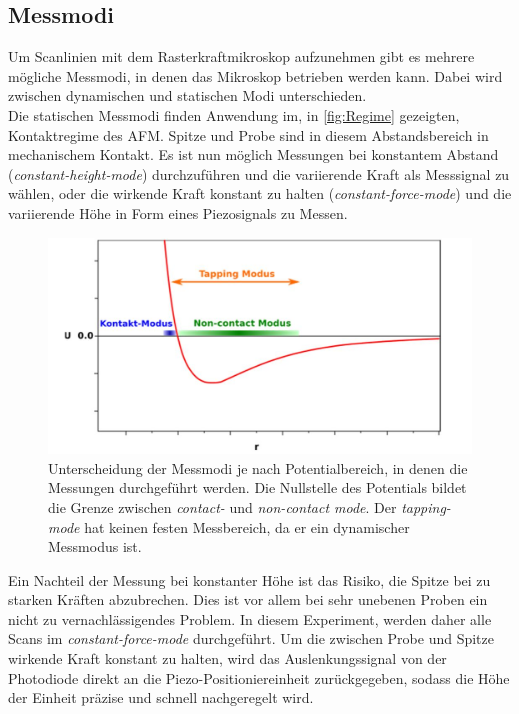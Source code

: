 \subsection{Messmodi}
\label{subsec:messmodi}
Um Scanlinien mit dem Rasterkraftmikroskop aufzunehmen gibt es mehrere mögliche Messmodi, in denen das Mikroskop betrieben werden kann. Dabei wird zwischen dynamischen und statischen Modi unterschieden.\\
Die statischen Messmodi finden Anwendung im, in \autoref{fig:Regime} gezeigten, Kontaktregime des AFM. Spitze und Probe sind in diesem Abstandsbereich in mechanischem Kontakt. Es ist nun möglich Messungen bei konstantem Abstand (\textit{constant-height-mode}) durchzuführen und die variierende Kraft als Messsignal zu wählen, oder die wirkende Kraft konstant zu halten (\textit{constant-force-mode}) und die variierende Höhe in Form eines Piezosignals zu Messen.\\
\begin{figure}[H]
  \centering
  \includegraphics[width=\textwidth]{content/plots/regime.jpg}
  \caption{Unterscheidung der Messmodi je nach Potentialbereich, in denen die Messungen durchgeführt werden. Die Nullstelle des Potentials bildet die Grenze zwischen \textit{contact-} und \textit{non-contact mode}. Der \textit{tapping-mode} hat keinen festen Messbereich, da er ein dynamischer Messmodus ist. }
  \label{fig:Regime}
\end{figure}
Ein Nachteil der Messung bei konstanter Höhe ist das Risiko, die Spitze bei zu starken Kräften abzubrechen. Dies ist vor allem bei sehr unebenen Proben ein nicht zu vernachlässigendes Problem.
In diesem Experiment, werden daher alle Scans im \textit{constant-force-mode} durchgeführt. Um die zwischen Probe und Spitze wirkende Kraft konstant zu halten, wird das Auslenkungssignal von der Photodiode direkt an die Piezo-Positioniereinheit zurückgegeben, sodass die Höhe der Einheit präzise und schnell nachgeregelt wird.\\
